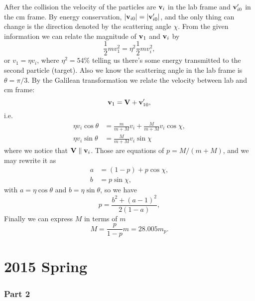 \documentclass[10pt]{article}
\begin{document}
After the collision the velocity of the particles are $\vb{v}_i$ in the lab frame and $\vb{v}'_{i0}$ in the cm frame. By energy conservation, $\abs{\vb{v}_{i0}} =\abs{\vb{v}'_{i 0}}$, and the only thing can change is the direction denoted by the scattering angle $\chi$. From the given information we can relate the magnitude of $\vb{v}_1$ and $\vb{v}_i$ by 
\begin{equation}
	\frac{1}{2} m v_1^2 = \eta^2 \frac{1}{2} m v_i^2,
\end{equation}
or $v_1 = \eta v_i$, where $\eta^2 = 54\%$ telling us there's some energy transmitted to the second particle (target). Also we know the scattering angle in the lab frame is $\theta = \pi/3$. By the Galilean transformation we relate the velocity between lab and cm frame:
\begin{equation}
	\vb{v}_1 = \vb{V} + \vb{v}'_{10},
\end{equation}
i.e. 
\begin{align*}
	\eta v_i \cos{\theta} &= \frac{m}{m+M} v_i + \frac{M}{m+M} v_i \cos{\chi}, \\
	\eta v_i \sin{\theta} &= \frac{M}{m+M} v_i \sin{\chi} 
\end{align*}
where we notice that $\vb{V} \parallel \vb{v}_i$. Those are equations of $p = M / (m+M)$, and we may rewrite it as 
\begin{align}
	a &= (1-p) + p \cos{\chi}, \\
	b &= p \sin{\chi},
\end{align}
with $a = \eta \cos{\theta}$ and $b = \eta \sin{\theta}$, so we have 
\begin{equation}
	p = \frac{b^2 + (a-1)^2}{2(1-a)},
\end{equation}
Finally we can express $M$ in terms of $m$ 
\begin{equation}
	M = \frac{p}{1-p} m = 28.005 m_p.
\end{equation}

\part{2015 Spring}
\section{Part 2}
\end{document}
